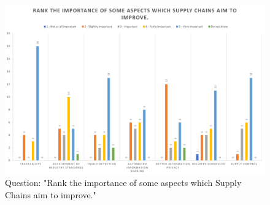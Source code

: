 
\begin{figure}[h]
\centering
\includegraphics[scale=0.60]{media/survey_group4/importance_SC_improvement_points.pdf}
\caption{Question: "Rank the importance of some aspects which Supply Chains aim to improve."}
\label{fig:importance_SC_improvement_points}
\end{figure}


